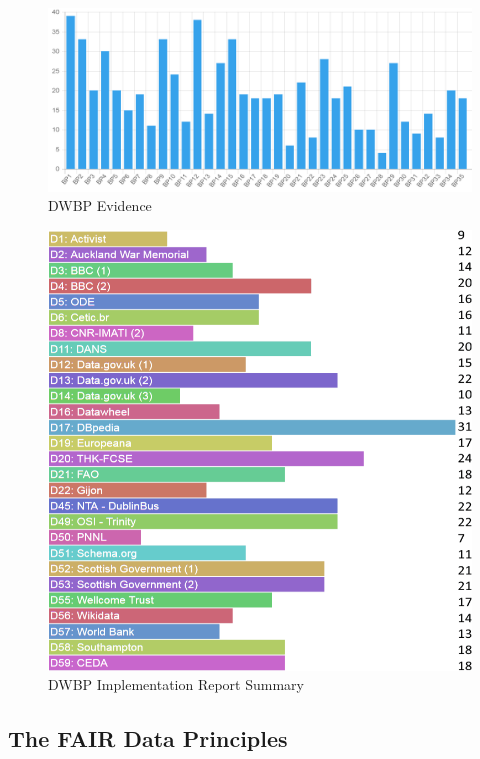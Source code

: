 \documentclass[a4paper,english,twoside,BCOR1.5cm,headsepline,DIV12,appendixprefix,final,12pt]{scrbook}
\begin{document}
\begin{figure}[!htbp]
\vspace*{-1.2cm}
\centering
  \includegraphics[width=\textwidth]{images/DwbpEvidence.png}
  \caption{DWBP Evidence}
  \label{fig:evaldwbpevience}
\end{figure}

\begin{figure}[!htbp]
\centering
  \includegraphics[width=12cm]{images/evalDWBP.png}
  \caption{DWBP Implementation Report Summary}
  \label{fig:evaldwbpdatasets}
\end{figure}

\subsection{The FAIR Data Principles} 
\label{sec:evalfair}
\end{document}
